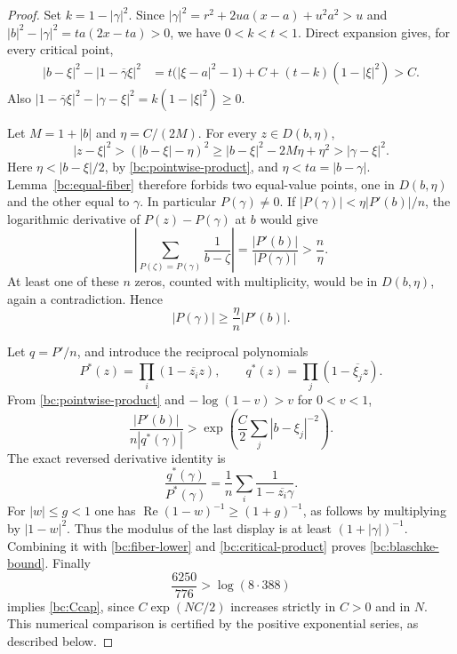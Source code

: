 \documentclass[11pt,reqno]{amsart}
\numberwithin{equation}{section}
\theoremstyle{definition}
\theoremstyle{remark}
\renewcommand{\Re}{\operatorname{Re}}
\begin{document}
\begin{proof}
Set $k=1-|\gamma|^2$.  Since
$|\gamma|^2=r^2+2ua(x-a)+u^2a^2>u$ and
$|b|^2-|\gamma|^2=ta(2x-ta)>0$, we have $0<k<t<1$.
Direct expansion gives, for every critical point,
\begin{align}
 |b-\xi|^2-|1-\overline\gamma\xi|^2
 &=t\bigl(|\xi-a|^2-1\bigr)
   +C+(t-k)(1-|\xi|^2)>C.             \label{bc:pointwise-product}
\end{align}
Also $|1-\overline\gamma\xi|^2-|\gamma-\xi|^2
=k(1-|\xi|^2)\geq0$.

Let $M=1+|b|$ and $\eta=C/(2M)$.  For every $z\in D(b,\eta)$,
\[
 |z-\xi|^2>(|b-\xi|-\eta)^2
 \geq |b-\xi|^2-2M\eta+\eta^2>|\gamma-\xi|^2.
\]
Here $\eta<|b-\xi|/2$, by \eqref{bc:pointwise-product}, and
$\eta<ta=|b-\gamma|$.  Lemma~\ref{bc:equal-fiber}
therefore forbids two equal-value points, one in $D(b,\eta)$ and the
other equal to $\gamma$.  In particular $P(\gamma)\ne0$.
If $|P(\gamma)|<\eta|P'(b)|/n$, the logarithmic derivative of
$P(z)-P(\gamma)$ at $b$ would give
\[
 \left|\sum_{P(\zeta)=P(\gamma)}\frac1{b-\zeta}\right|
 =\frac{|P'(b)|}{|P(\gamma)|}>\frac n\eta.
\]
At least one of these $n$ zeros, counted with multiplicity, would be in
$D(b,\eta)$, again a contradiction.  Hence
\begin{equation}\label{bc:fiber-lower}
 |P(\gamma)|\geq\frac{\eta}{n}|P'(b)|.
\end{equation}

Let $q=P'/n$, and introduce the reciprocal polynomials
\[
 P^*(z)=\prod_i(1-\overline{z_i}z),\qquad
 q^*(z)=\prod_j(1-\overline{\xi_j}z).
\]
From \eqref{bc:pointwise-product} and $-\log(1-v)>v$ for $0<v<1$,
\begin{equation}\label{bc:critical-product}
 \frac{|P'(b)|}{n|q^*(\gamma)|}>
 \exp\left(\frac C2\sum_j|b-\xi_j|^{-2}\right).
\end{equation}
The exact reversed derivative identity is
\[
 \frac{q^*(\gamma)}{P^*(\gamma)}
 =\frac1n\sum_i\frac1{1-\overline{z_i}\gamma}.
\]
For $|w|\leq g<1$ one has $\Re(1-w)^{-1}\geq(1+g)^{-1}$,
as follows by multiplying by $|1-w|^2$.  Thus the modulus of the last
display is at least $(1+|\gamma|)^{-1}$.  Combining it with
\eqref{bc:fiber-lower} and \eqref{bc:critical-product} proves
\eqref{bc:blaschke-bound}.  Finally
\[
 \frac{6250}{776}>\log(8\cdot388)
\]
implies \eqref{bc:Ccap}, since $C\exp(NC/2)$ increases strictly in
$C>0$ and in $N$.  This numerical comparison is certified by the
positive exponential series, as described below.
\end{proof}
\end{document}
